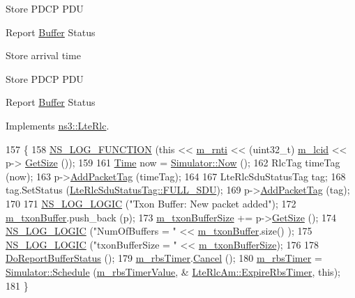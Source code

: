 Store P\+D\+CP P\+DU

Report \hyperlink{classns3_1_1Buffer}{Buffer} Status

Store arrival time

Store P\+D\+CP P\+DU

Report \hyperlink{classns3_1_1Buffer}{Buffer} Status 

Implements \hyperlink{classns3_1_1LteRlc_af1e6ccdc5f9f2bee9d42a056e94351a5}{ns3\+::\+Lte\+Rlc}.


\begin{DoxyCode}
157 \{
158   \hyperlink{log-macros-disabled_8h_a90b90d5bad1f39cb1b64923ea94c0761}{NS\_LOG\_FUNCTION} (\textcolor{keyword}{this} << \hyperlink{classns3_1_1LteRlc_a48ab0a78e7f2687337075b1c8832df70}{m\_rnti} << (uint32\_t) \hyperlink{classns3_1_1LteRlc_a051085e9b27883e7ba4b98ad7242fd8a}{m\_lcid} << p->
      \hyperlink{classns3_1_1Packet_a462855c9929954d4301a4edfe55f4f1c}{GetSize} ());
159 
161   \hyperlink{namespacens3_1_1TracedValueCallback_a7ffd3e7c142ffe7c8a1d2db9b8de38ec}{Time} now = \hyperlink{classns3_1_1Simulator_ac3178fa975b419f7875e7105be122800}{Simulator::Now} ();
162   RlcTag timeTag (now);
163   p->\hyperlink{classns3_1_1Packet_a7400b8655852f5271c5957250d0141af}{AddPacketTag} (timeTag);
164 
167   LteRlcSduStatusTag tag;
168   tag.SetStatus (\hyperlink{classns3_1_1LteRlcSduStatusTag_ae7822c5cc0d54a3d193b09a91ed6f133ade41b0025c66cd211e992196f314d4a5}{LteRlcSduStatusTag::FULL\_SDU});
169   p->\hyperlink{classns3_1_1Packet_a7400b8655852f5271c5957250d0141af}{AddPacketTag} (tag);
170 
171   \hyperlink{group__logging_ga88acd260151caf2db9c0fc84997f45ce}{NS\_LOG\_LOGIC} (\textcolor{stringliteral}{"Txon Buffer: New packet added"});
172   \hyperlink{classns3_1_1LteRlcAm_ad8ba4549a7c78cfe0e528d2e9cc465f8}{m\_txonBuffer}.push\_back (p);
173   \hyperlink{classns3_1_1LteRlcAm_a3e8db6b5bc1d3fcc215d554e8d347eda}{m\_txonBufferSize} += p->\hyperlink{classns3_1_1Packet_a462855c9929954d4301a4edfe55f4f1c}{GetSize} ();
174   \hyperlink{group__logging_ga88acd260151caf2db9c0fc84997f45ce}{NS\_LOG\_LOGIC} (\textcolor{stringliteral}{"NumOfBuffers = "} << \hyperlink{classns3_1_1LteRlcAm_ad8ba4549a7c78cfe0e528d2e9cc465f8}{m\_txonBuffer}.size() );
175   \hyperlink{group__logging_ga88acd260151caf2db9c0fc84997f45ce}{NS\_LOG\_LOGIC} (\textcolor{stringliteral}{"txonBufferSize = "} << \hyperlink{classns3_1_1LteRlcAm_a3e8db6b5bc1d3fcc215d554e8d347eda}{m\_txonBufferSize});
176 
178   \hyperlink{classns3_1_1LteRlcAm_ad81917dde659b1c241aa8d22013c8f4b}{DoReportBufferStatus} ();
179   \hyperlink{classns3_1_1LteRlcAm_a6c9e3ac7026e952b3e2e48da74a5bf4b}{m\_rbsTimer}.\hyperlink{classns3_1_1EventId_a993ae94e48e014e1afd47edb16db7a11}{Cancel} ();
180   \hyperlink{classns3_1_1LteRlcAm_a6c9e3ac7026e952b3e2e48da74a5bf4b}{m\_rbsTimer} = \hyperlink{classns3_1_1Simulator_a671882c894a08af4a5e91181bf1eec13}{Simulator::Schedule} (\hyperlink{classns3_1_1LteRlcAm_afffa23f61257ead4b1356c82c32d54cf}{m\_rbsTimerValue}, &
      \hyperlink{classns3_1_1LteRlcAm_ab21792f74446b1f4990e22c1113f8b2c}{LteRlcAm::ExpireRbsTimer}, \textcolor{keyword}{this});
181 \}
\end{DoxyCode}


